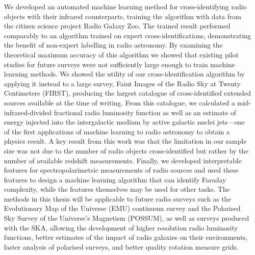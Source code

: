 \documentclass[11pt, a4paper]{book}
\begin{document}
We developed an automated machine learning method for cross-identifying radio objects with their infrared counterparts, training the algorithm with data from the citizen science project Radio Galaxy Zoo. The trained result performed comparably to an algorithm trained on expert cross-identifications, demonstrating the benefit of non-expert labelling in radio astronomy. By examining the theoretical maximum accuracy of this algorithm we showed that existing pilot studies for future surveys were not sufficiently large enough to train machine learning methods. We showed the utility of our cross-identification algorithm by applying it instead to a large survey, Faint Images of the Radio Sky at Twenty Centimeters (FIRST), producing the largest catalogue of cross-identified extended sources available at the time of writing. From this catalogue, we calculated a mid-infrared-divided fractional radio luminosity function as well as an estimate of energy injected into the intergalactic medium by active galactic nuclei jets---one of the first applications of machine learning to radio astronomy to obtain a physics result. A key result from this work was that the limitation in our sample size was not due to the number of radio objects cross-identified but rather by the number of available redshift measurements. Finally, we developed interpretable features for spectropolarimetric measurements of radio sources and used these features to design a machine learning algorithm that can identify Faraday complexity, while the features themselves may be used for other tasks. The methods in this thesis will be applicable to future radio surveys such as the Evolutionary Map of the Universe (EMU) continuum survey and the Polarised Sky Survey of the Universe's Magnetism (POSSUM), as well as surveys produced with the SKA, allowing the development of higher resolution radio luminosity functions, better estimates of the impact of radio galaxies on their environments, faster analysis of polarised surveys, and better quality rotation measure grids.


\cleardoublepage
\pagestyle{headings}
\tableofcontents\newpage
{}
\listoffigures
{}\newpage
{}
\listoftables
{}
\end{document}

